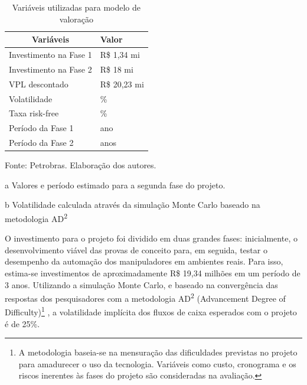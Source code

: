 \begin{table}[h]
	\renewcommand{\arraystretch}{1.2}
	\centering
	\begin{threeparttable}
	\centering
	\caption{Variáveis utilizadas para modelo de valoração}
	\label{tab:valor1}
	\begin{tabular}{p{8cm} >{\centering\arraybackslash}m{3.7cm}}
		\hline
		\multicolumn{1}{c}{\textbf{Variáveis}} & \textbf{Valor} \\ \hline
		Investimento na Fase 1                 & R\$ 1,34 mi    \\
		Investimento na Fase 2\tnote{a}        & R\$ 18 mi      \\
		VPL descontado                         & R\$ 20,23 mi   \\
		Volatilidade\tnote{b}                  & 25\%           \\
		Taxa risk-free                         & 5\%            \\
		Período da Fase 1                      & 1 ano          \\
		Período da Fase 2                      & 2 anos         \\ \hline
	\end{tabular}
	\begin{tablenotes}
		\item Fonte: Petrobras. Elaboração dos autores.
		\item [a]Valores e período estimado para a segunda fase do projeto.
		\item [b]Volatilidade calculada através da simulação Monte Carlo baseado na metodologia AD\textsuperscript{2}
	\end{tablenotes}
\end{threeparttable}
\end{table}

O investimento para o projeto foi dividido em duas grandes fases: inicialmente, o desenvolvimento viável das provas de conceito para, em seguida, testar o desempenho da automação dos manipuladores em ambientes reais. Para isso, estima-se investimentos de aproximadamente R\$ 19,34 milhões em um período de 3 anos. Utilizando a simulação Monte Carlo, e baseado na convergência das respostas dos pesquisadores com a metodologia AD\textsuperscript{2} (Advancement Degree of Difficulty)\footnote{A metodologia baseia-se na mensuração das dificuldades previstas no projeto para amadurecer o uso da tecnologia. Variáveis como custo, cronograma e os riscos inerentes às fases do projeto são consideradas na avaliação.} , a volatilidade implícita dos fluxos de caixa esperados com o projeto é de 25\%. 


